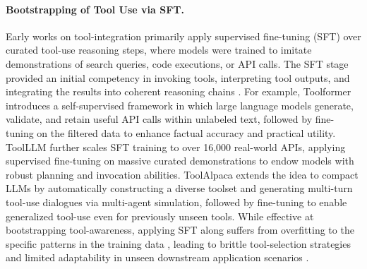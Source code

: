 \paragraph{Bootstrapping of Tool Use via SFT.} \space Early works on tool-integration \citep{yao2023react, schick2023toolformer, DBLP:conf/iclr/QinLYZYLLCTQZHT24, DBLP:journals/corr/abs-2306-05301, lu2023chameleon, song2023restgpt, prasad2023adapt, yin2023agent, shi2024learning} primarily apply supervised fine-tuning (SFT) over curated tool-use reasoning steps, where models were trained to imitate demonstrations of search queries, code executions, or API calls. The SFT stage provided an initial competency in invoking tools, interpreting tool outputs, and integrating the results into coherent reasoning chains \citep{song2023restgpt, shinn2023reflexion}. For example, 
Toolformer \cite{schick2023toolformer} introduces a self-supervised framework in which large language models generate, validate, and retain useful API calls within unlabeled text, followed by fine-tuning on the filtered data to enhance factual accuracy and practical utility. 
ToolLLM \cite{DBLP:conf/iclr/QinLYZYLLCTQZHT24} further scales SFT training to over 16,000 real-world APIs, applying supervised fine-tuning on massive curated demonstrations to endow models with robust planning and invocation abilities. ToolAlpaca \cite{DBLP:journals/corr/abs-2306-05301} extends the idea to compact LLMs by automatically constructing a diverse toolset and generating multi-turn tool-use dialogues via multi-agent simulation, followed by fine-tuning to enable generalized tool-use even for previously unseen tools. While effective at bootstrapping tool-awareness, applying SFT along suffers from overfitting to the specific patterns in the training data \cite{kirk2023understanding, li2024preserving, o2024attributing, zou2025transformer}, leading to brittle tool-selection strategies and limited adaptability in unseen downstream application scenarios \citep{zeng2025itool,qian2025toolrl,yu2025demystifying}.

